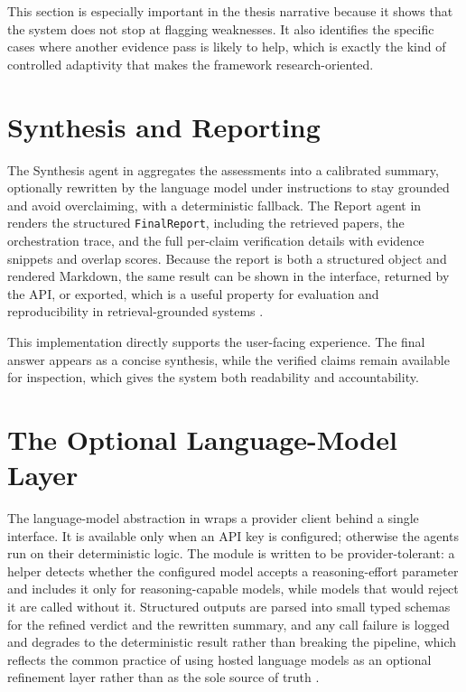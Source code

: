 This section is especially important in the thesis narrative because it shows that the system does not stop at
flagging weaknesses. It also identifies the specific cases where another evidence pass is likely to help, which is
exactly the kind of controlled adaptivity that makes the framework research-oriented.

\section{Synthesis and Reporting }

The Synthesis agent in  aggregates the assessments into a calibrated summary, optionally
rewritten by the language model under instructions to stay grounded and avoid overclaiming, with a deterministic
fallback. The Report agent in  renders the structured \texttt{FinalReport}, including the
retrieved papers, the orchestration trace, and the full per-claim verification details with evidence snippets and
overlap scores. Because the report is both a structured object and rendered Markdown, the same result can be shown
in the interface, returned by the API, or exported, which is a useful property for evaluation and reproducibility
in retrieval-grounded systems \cite{es2023ragas,min2023factscore,lin2021truthfulqa}.

This implementation directly supports the user-facing experience. The final answer appears as a concise synthesis,
while the verified claims remain available for inspection, which gives the system both readability and
accountability.

\section{The Optional Language-Model Layer }

The language-model abstraction in  wraps a provider client behind a single interface. It is available
only when an API key is configured; otherwise the agents run on their deterministic logic. The module is written to
be provider-tolerant: a helper detects whether the configured model accepts a reasoning-effort parameter and
includes it only for reasoning-capable models, while models that would reject it are called without it. Structured
outputs are parsed into small typed schemas for the refined verdict and the rewritten summary, and any call failure
is logged and degrades to the deterministic result rather than breaking the pipeline, which reflects the common
practice of using hosted language models as an optional refinement layer rather than as the sole source of truth
\cite{kadavath2022language,shinn2023reflexion,wu2023autogen}.

